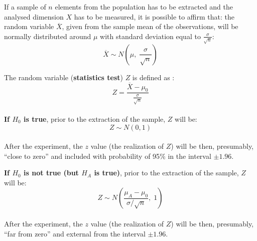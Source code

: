 \begin{frame}
  \vspace*{.5cm}
  If a sample of $ n $ elements from the population has to be extracted and the analysed dimension $ X $ has to be measured, it is possible to affirm that: the random variable $ \overline{X} $, given from the sample mean of the observations, will be normally distributed around $ \mu $ with standard deviation equal to $ \frac{\sigma}{\sqrt{n}} $:\\
  $$ \overline{X}\sim N\left(\mu,\; \frac{\sigma}{\sqrt{n}}\right) $$
\end{frame}

\begin{frame}
  \vspace*{.25cm}
  The random variable (\textbf{statistics test}) $ Z $ is defined as :
  $$ Z=\frac{\overline{X}-\mu_0}{\frac{\sigma}{\sqrt{n}}} $$\\
  \vspace*{.5cm} 
  \textbf{If {\boldmath $ H_0 $} is true}, prior to the extraction of the sample, $ Z $ will be:
  $$ Z \sim N(0,1) $$\\
  \vspace*{.5cm}
  After the experiment, the $ z $ value  (the realization of $ Z $) will be then, presumably, ``close to zero'' and included with probability of 95$ \% $ in the interval  $\pm 1.96$.\\
\end{frame}

\begin{frame}
  \vspace*{.25cm}
  \textbf{If {\boldmath $ H_0 $} is not true (but {\boldmath $ H_A $} is true)}, prior to the extraction of the sample, $ Z $ will be:
  $$ Z\sim N \left( \frac{\mu_A-\mu_0}{\sigma / \sqrt{n}}, \; 1 \right) $$\\
  \vspace*{.75cm}
  After the experiment, the $ z $ value (the realization of $ Z $) will be then, presumably, ``far from zero'' and external from the interval $ \pm 1.96 $.
\end{frame}


